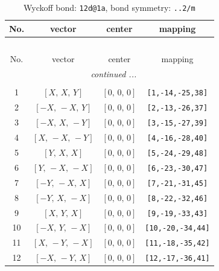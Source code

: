 \documentclass[fleqn,8pt]{jsarticle}
\begin{document}
\begin{longtable}{cccc}
\caption{Wyckoff bond: {\tt 12d@1a}, bond symmetry: {\tt ..2/m}}
 \\
 \hline \hline
No. & vector & center & mapping \\ \hline \endfirsthead

\multicolumn{3}{l}{\tablename\ \thetable{}} \\
 \hline \hline
No. & vector & center & mapping \\ \hline \endhead

 \hline \hline
\multicolumn{3}{r}{\footnotesize\it continued ...} \\ \endfoot

 \hline \hline
\multicolumn{3}{r}{} \\ \endlastfoot

1 & $\left[ X,\, X,\, Y \right]$ & $\left[ 0,\, 0,\, 0 \right]$ & {\tt [1,-14,-25,38]} \\ \hline
2 & $\left[ - X,\, - X,\, Y \right]$ & $\left[ 0,\, 0,\, 0 \right]$ & {\tt [2,-13,-26,37]} \\ \hline
3 & $\left[ - X,\, X,\, - Y \right]$ & $\left[ 0,\, 0,\, 0 \right]$ & {\tt [3,-15,-27,39]} \\ \hline
4 & $\left[ X,\, - X,\, - Y \right]$ & $\left[ 0,\, 0,\, 0 \right]$ & {\tt [4,-16,-28,40]} \\ \hline
5 & $\left[ Y,\, X,\, X \right]$ & $\left[ 0,\, 0,\, 0 \right]$ & {\tt [5,-24,-29,48]} \\ \hline
6 & $\left[ Y,\, - X,\, - X \right]$ & $\left[ 0,\, 0,\, 0 \right]$ & {\tt [6,-23,-30,47]} \\ \hline
7 & $\left[ - Y,\, - X,\, X \right]$ & $\left[ 0,\, 0,\, 0 \right]$ & {\tt [7,-21,-31,45]} \\ \hline
8 & $\left[ - Y,\, X,\, - X \right]$ & $\left[ 0,\, 0,\, 0 \right]$ & {\tt [8,-22,-32,46]} \\ \hline
9 & $\left[ X,\, Y,\, X \right]$ & $\left[ 0,\, 0,\, 0 \right]$ & {\tt [9,-19,-33,43]} \\ \hline
10 & $\left[ - X,\, Y,\, - X \right]$ & $\left[ 0,\, 0,\, 0 \right]$ & {\tt [10,-20,-34,44]} \\ \hline
11 & $\left[ X,\, - Y,\, - X \right]$ & $\left[ 0,\, 0,\, 0 \right]$ & {\tt [11,-18,-35,42]} \\ \hline
12 & $\left[ - X,\, - Y,\, X \right]$ & $\left[ 0,\, 0,\, 0 \right]$ & {\tt [12,-17,-36,41]} \\
\end{longtable}
\renewcommand{\arraystretch}{1.2}
\end{document}
